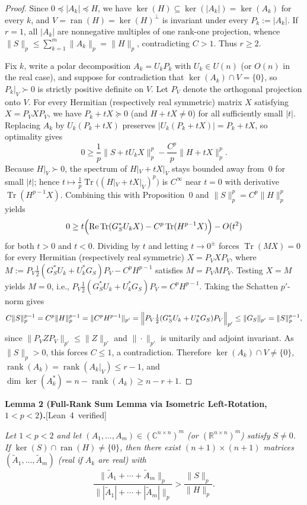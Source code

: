 \documentclass[10pt,letterpaper]{article}
\newcommand{\leanbadge}[1]{\mbox{\sffamily\scriptsize\color{leanborder}[#1]}}
\newcommand{\C}{\mathbb{C}}
\newcommand{\R}{\mathbb{R}}
\newcommand{\Tr}{\operatorname{Tr}}
\newcommand{\ran}{\operatorname{ran}}
\newcommand{\rank}{\operatorname{rank}}
\begin{document}
\begin{proof}
Since $0 \preceq |A_k| \preceq H$, we have $\ker(H) \subseteq \ker(|A_k|) = \ker(A_k)$ for every $k$, and $V = \ran(H) = \ker(H)^\perp$ is invariant under every $P_k := |A_k|$. If $r = 1$, all $|A_k|$ are nonnegative multiples of one rank-one projection, whence $\|S\|_p \le \sum_{k=1}^m \|A_k\|_p = \|H\|_p$, contradicting $C > 1$. Thus $r \ge 2$.

Fix $k$, write a polar decomposition $A_k = U_k P_k$ with $U_k \in U(n)$ (or $O(n)$ in the real case), and suppose for contradiction that $\ker(A_k) \cap V = \{0\}$, so $P_k|_V \succ 0$ is strictly positive definite on $V$. Let $P_V$ denote the orthogonal projection onto $V$. For every Hermitian (respectively real symmetric) matrix $X$ satisfying $X = P_V X P_V$, we have $P_k + tX \succeq 0$ (and $H + tX \neq 0$) for all sufficiently small $|t|$. Replacing $A_k$ by $U_k(P_k + tX)$ preserves $|U_k(P_k + tX)| = P_k + tX$, so optimality gives
\[
  0 \ge \frac{1}{p}\|S + t U_k X\|_p^p - \frac{C^p}{p}\|H + tX\|_p^p.
\]
Because $H|_V \succ 0$, the spectrum of $H|_V + tX|_V$ stays bounded away from~$0$ for small $|t|$; hence $t \mapsto \frac{1}{p}\Tr\bigl((H|_V + tX|_V)^p\bigr)$ is $C^\infty$ near $t = 0$ with derivative $\Tr(H^{p-1} X)$. Combining this with Proposition~0 and $\|S\|_p^p = C^p \|H\|_p^p$ yields
\[
  0 \ge t\Bigl(\operatorname{Re}\Tr(G_S^* U_k X) - C^p \Tr(H^{p-1} X)\Bigr) - O(t^2)
\]
for both $t > 0$ and $t < 0$. Dividing by $t$ and letting $t \to 0^{\pm}$ forces $\Tr(M X) = 0$ for every Hermitian (respectively real symmetric) $X = P_V X P_V$, where $M := P_V\frac{1}{2}(G_S^* U_k + U_k^* G_S)P_V - C^p H^{p-1}$ satisfies $M = P_V M P_V$. Testing $X = M$ yields $M = 0$, i.e., $P_V\frac{1}{2}(G_S^* U_k + U_k^* G_S)P_V = C^p H^{p-1}$. Taking the Schatten $p'$-norm gives
\[
  C\|S\|_p^{p-1} = C^p \|H\|_p^{p-1} = \|C^p H^{p-1}\|_{p'} = \Bigl\|P_V\tfrac{1}{2}(G_S^* U_k + U_k^* G_S)P_V\Bigr\|_{p'} \le \|G_S\|_{p'} = \|S\|_p^{p-1},
\]
since $\|P_V Z P_V\|_{p'} \le \|Z\|_{p'}$ and $\|\cdot\|_{p'}$ is unitarily and adjoint invariant. As $\|S\|_p > 0$, this forces $C \le 1$, a contradiction. Therefore $\ker(A_k) \cap V \neq \{0\}$, $\rank(A_k) = \rank(A_k|_V) \le r - 1$, and $\dim\ker(A_k^*) = n - \rank(A_k) \ge n - r + 1$.
\end{proof}

\begin{tcolorbox}[lemmabox]
\textbf{Lemma 2 (Full-Rank Sum Lemma via Isometric Left-Rotation, $1 < p < 2$).}\hfill\leanbadge{Lean~4 verified}\par\vspace{1.5pt}
\emph{Let $1 < p < 2$ and let $(A_1,\dots,A_m) \in (\C^{n\times n})^m$ (or $(\R^{n\times n})^m$) satisfy $S \neq 0$. If $\ker(S) \cap \ran(H) \neq \{0\}$, then there exist $(n+1)\times(n+1)$ matrices $(\widetilde{A}_1,\dots,\widetilde{A}_m)$ (real if $A_k$ are real) with}
\[
  \frac{\|\widetilde{A}_1 + \cdots + \widetilde{A}_m\|_p}{\||\widetilde{A}_1| + \cdots + |\widetilde{A}_m|\|_p} > \frac{\|S\|_p}{\|H\|_p}.
\]
\end{tcolorbox}
\end{document}
